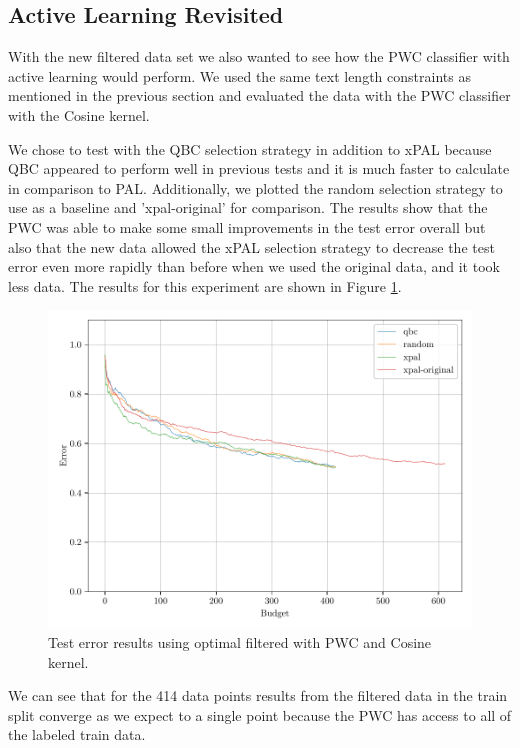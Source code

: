 \subsection{Active Learning Revisited}

With the new filtered data set we also wanted to see how the PWC classifier with active learning would perform. We used the same text length constraints as mentioned in the previous section and evaluated the data with the PWC classifier with the Cosine kernel. 

We chose to test with the QBC selection strategy in addition to xPAL because QBC appeared to perform well in previous tests and it is much faster to calculate in comparison to PAL. Additionally, we plotted the random selection strategy to use as a baseline and 'xpal-original' for comparison. The results show that the PWC was able to make some small improvements in the test error overall but also that the new data allowed the xPAL selection strategy to decrease the test error even more rapidly than before when we used the original data, and it took less data. The results for this experiment are shown in Figure \ref{fig:probal_filtered_data}.

\begin{figure}[ht]
    \centering
    \includegraphics[width=\scale\textwidth]{../img/plot_filtered_test_results.pdf}
    \caption{Test error results using optimal filtered with PWC and Cosine kernel.}
    \label{fig:probal_filtered_data}
  \end{figure}

We can see that for the 414 data points results from the filtered data in the train split converge as we expect to a single point because the PWC has access to all of the labeled train data. 

